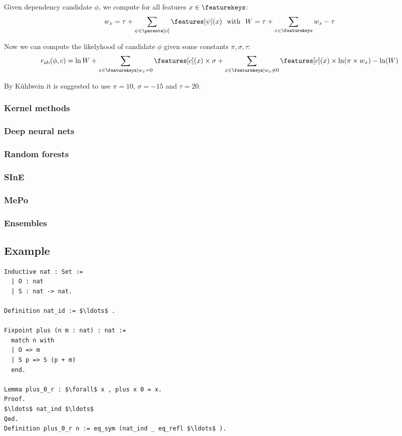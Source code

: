 \subsubsection{\nb}

Given dependency candidate $\phi$, we compute for all features $x \in \featurekeys$:
\[
	w_x = \tau + \sum_{\psi \in \parents[\phi]} \features[\psi](x) ~~\text{with}~~ W = \tau + \sum_{x \in \featurekeys} w_x - \tau
\]

Now we can compute the likelyhood of candidate $\phi$ given some constants $\pi, \sigma, \tau$:
\[
	r_\text{nb}(\phi, c) = \ln W +
	\sum_{x \in \featurekeys | w_x = 0} \features[c](x) \times \sigma +
	\sum_{x \in \featurekeys | w_x \neq 0} \features[c](x) \times \ln(\pi \times w_x) - \ln(W)
\]

By K\"uhlwein \cite{kuhlwein2013mash} it is suggested to use $\pi = 10$, $\sigma = -15$ and $\tau = 20$.

\subsubsection{Kernel methods}
\subsubsection{Deep neural nets}
\subsubsection{Random forests}
\subsubsection{SInE}
\subsubsection{MePo}
\subsubsection{Ensembles}

\subsection{Example}
\begin{lstlisting}[language=Coq, mathescape]
Inductive nat : Set :=
  | O : nat
  | S : nat -> nat.

Definition nat_id := $\ldots$ .

Fixpoint plus (n m : nat) : nat :=
  match n with
  | O => m
  | S p => S (p + m)
  end.

Lemma plus_0_r : $\forall$ x , plus x 0 = x.
Proof.
$\ldots$ nat_ind $\ldots$
Qed.
Definition plus_0_r n := eq_sym (nat_ind _ eq_refl $\ldots$ ).
\end{lstlisting}

